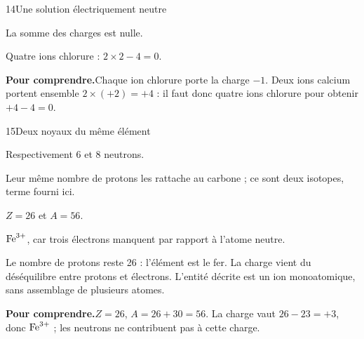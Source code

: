 \par\noindent\begin{minipage}{\linewidth}
\begin{corrige}{14}{Une solution électriquement neutre}
\begin{questions}
\item La somme des charges est nulle.
\item Quatre ions chlorure : $2\times2-4=0$.
\end{questions}
\par\smallskip\noindent\textbf{Pour comprendre.}\enspace Chaque ion chlorure porte la charge $-1$. Deux ions calcium portent ensemble $2\times(+2)=+4$ : il faut donc quatre ions chlorure pour obtenir $+4-4=0$.\par
{}
\end{corrige}
\end{minipage}
\par\noindent\begin{minipage}{\linewidth}
\begin{corrige}{15}{Deux noyaux du même élément}
\begin{questions}
\item Respectivement 6 et 8 neutrons.
\item Leur même nombre de protons les rattache au carbone ; ce sont deux isotopes, terme fourni ici.
\end{questions}
\end{corrige}
\end{minipage}
\par\noindent\begin{minipage}{\linewidth}
\label{cor-defi-2}\begin{questions}
\item $Z=26$ et $A=56$.
\item $\ce{Fe^{3+}}$, car trois électrons manquent par rapport à l’atome neutre.
\item Le nombre de protons reste 26 : l’élément est le fer. La charge vient du déséquilibre entre protons et électrons. L’entité décrite est un ion monoatomique, sans assemblage de plusieurs atomes.
\end{questions}
\par\smallskip\noindent\textbf{Pour comprendre.}\enspace $Z=26$, $A=26+30=56$. La charge vaut $26-23=+3$, donc $\ce{Fe^3+}$ ; les neutrons ne contribuent pas à cette charge.\par
{}
\end{minipage}
